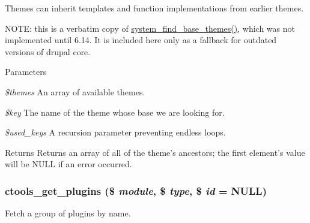 Themes can inherit templates and function implementations from earlier themes.

NOTE: this is a verbatim copy of \hyperlink{system_8module_a0cd2b51f55ab9299f139f9916bf7a7c0}{system\_\-find\_\-base\_\-themes()}, which was not implemented until 6.14. It is included here only as a fallback for outdated versions of drupal core.


\begin{DoxyParams}{Parameters}
\item[{\em \$themes}]An array of available themes. \item[{\em \$key}]The name of the theme whose base we are looking for. \item[{\em \$used\_\-keys}]A recursion parameter preventing endless loops. \end{DoxyParams}
\begin{DoxyReturn}{Returns}
Returns an array of all of the theme's ancestors; the first element's value will be NULL if an error occurred. 
\end{DoxyReturn}
\hypertarget{ctools_2includes_2plugins_8inc_aad93a9aa7b585e33d6696ac0b9ec42fc}{
\subsubsection[{ctools\_\-get\_\-plugins}]{\setlength{\rightskip}{0pt plus 5cm}ctools\_\-get\_\-plugins (\$ {\em module}, \/  \$ {\em type}, \/  \$ {\em id} = {\ttfamily NULL})}}
\label{ctools_2includes_2plugins_8inc_aad93a9aa7b585e33d6696ac0b9ec42fc}
Fetch a group of plugins by name.


